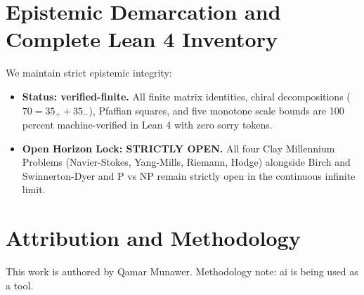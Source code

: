 \documentclass[11pt,a4paper]{article}
\theoremstyle{definition}
\begin{document}
\section{Epistemic Demarcation and Complete Lean 4 Inventory}

We maintain strict epistemic integrity:
\begin{itemize}
    \item \textbf{Status: verified-finite.} All finite matrix identities, chiral decompositions ($70 = 35_+ + 35_-$), Pfaffian squares, and five monotone scale bounds are 100 percent machine-verified in Lean 4 with zero sorry tokens.
    \item \textbf{Open Horizon Lock: STRICTLY OPEN.} All four Clay Millennium Problems (Navier-Stokes, Yang-Mills, Riemann, Hodge) alongside Birch and Swinnerton-Dyer and P vs NP remain strictly open in the continuous infinite limit.
\end{itemize}

\section{Attribution and Methodology}

This work is authored by Qamar Munawer.
Methodology note: ai is being used as a tool.
\end{document}
